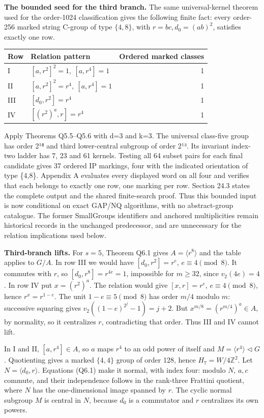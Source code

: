 \documentclass[
  10pt,
  letterpaper,
]{article}
\newcounter{none} %
\begin{document}
\textbf{The bounded seed for the third branch.} The same
universal-kernel theorem used for the order-1024 classification gives
the following finite fact: every order-256 marked string C-group of type
\(\{4,8\}\), with \(r=bc,d_0=(ab)^2\), satisfies exactly one row.

{\def\LTcaptype{none} %
\begin{longtable}[]{@{}llr@{}}
\toprule\noalign{}
Row & Relation pattern & Ordered marked classes \\
\midrule\noalign{}
\endhead
\bottomrule\noalign{}
\endlastfoot
I & \([a,r^2]^2=1,\ [a,r^4]=1\) & 1 \\
II & \([a,r^2]^2=r^4,\ [a,r^4]=1\) & 1 \\
III & \([d_0,r^2]=r^4\) & 1 \\
IV & \([(r^2)^a,r]=r^4\) & 1 \\
\end{longtable}
}

Apply Theorems Q5.5--Q5.6 with d=3 and k=3. The universal class-five
group has order 2¹⁸ and third lower-central subgroup of order 2¹³. Its
invariant index-two ladder has 7, 23 and 61 kernels. Testing all 64
subset pairs for each final candidate gives 37 ordered IP markings, four
with the indicated orientation of type \{4,8\}. Appendix A evaluates
every displayed word on all four and verifies that each belongs to
exactly one row, one marking per row. Section 24.3 states the complete
output and the shared finite-search proof. Thus this bounded input is
now conditional on exact GAP/NQ algorithms, with no abstract-group
catalogue. The former SmallGroups identifiers and anchored
multiplicities remain historical records in the unchanged predecessor,
and are unnecessary for the relation implications used below.

\textbf{Third-branch lifts.} For \(s=5\), Theorem Q6.1 gives
\(A=\langle r^8\rangle\) and the table applies to \(G/A\). In row III we
would have \([d_0,r^2]=r^e\), \(e\equiv4\pmod8\). It commutes with
\(r\), so \([d_0,r^8]=r^{4e}=1\), impossible for \(m\ge32\), since
\(v_2(4e)=4\). In row IV put \(x=(r^2)^a\). The relation would give
\([x,r]=r^e\), \(e\equiv4\pmod8\), hence \(r^x=r^{1-e}\). The unit
\(1-e\equiv5\pmod8\) has order \(m/4\) modulo \(m\): successive squaring
gives \(v_2((1-e)^{2^j}-1)=j+2\). But \(x^{m/8}=(r^{m/4})^a\in A\), by
normality, so it centralizes \(r\), contradicting that order. Thus III
and IV cannot lift.

In I and II, \([a,r^4]\in A\), so \(a\) maps \(r^4\) to an odd power of
itself and \(M=\langle r^4\rangle\lhd G\). Quotienting gives a marked
\(\{4,4\}\) group of order 128, hence \(H_7=W/4\mathbb Z^2\). Let
\(N=\langle d_0,r\rangle\). Equations (Q6.1) make it normal, with index
four: modulo \(N\), \(a,c\) commute, and their independence follows in
the rank-three Frattini quotient, where \(N\) has the one-dimensional
image spanned by \(r\). The cyclic normal subgroup \(M\) is central in
\(N\), because \(d_0\) is a commutator and \(r\) centralizes its own
powers.
\end{document}
